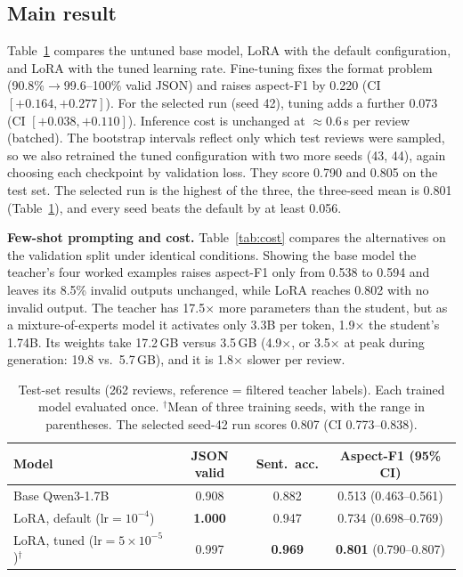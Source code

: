 \documentclass[journal]{IEEEtran}
\begin{document}
\subsection{Main result}
Table~\ref{tab:main} compares the untuned base model, LoRA with the default configuration, and LoRA with the tuned
learning rate. Fine-tuning fixes the format problem (90.8\%$\rightarrow$99.6--100\% valid JSON) and raises
aspect-F1 by 0.220 (CI $[+0.164, +0.277]$). For the selected run (seed 42), tuning adds a further 0.073
(CI $[+0.038, +0.110]$). Inference cost is unchanged at $\approx$0.6\,s per review (batched). The bootstrap intervals
reflect only which test reviews were sampled, so we also retrained the tuned configuration with two more seeds (43, 44),
again choosing each checkpoint by validation loss. They score 0.790 and 0.805 on the test set. The selected run is the
highest of the three, the three-seed mean is 0.801 (Table~\ref{tab:main}), and every seed beats the default by at least
0.056.

\textbf{Few-shot prompting and cost.} Table~\ref{tab:cost} compares the alternatives on the validation split under
identical conditions. Showing the base model the teacher's four worked examples raises aspect-F1 only from 0.538 to 0.594
and leaves its 8.5\% invalid outputs unchanged, while LoRA reaches 0.802 with no invalid output. The teacher has
17.5$\times$ more parameters than the student, but as a mixture-of-experts model it activates only 3.3B per token,
1.9$\times$ the student's 1.74B. Its weights take 17.2\,GB versus 3.5\,GB (4.9$\times$, or 3.5$\times$ at peak during
generation: 19.8 vs.\ 5.7\,GB), and it is 1.8$\times$ slower per review.

\begin{table}[t]
\centering
\caption{Test-set results (262 reviews, reference = filtered teacher labels). Each trained model evaluated once.
$^\dagger$Mean of three training seeds, with the range in parentheses. The selected seed-42 run scores 0.807
(CI 0.773--0.838).}
\label{tab:main}
\setlength{\tabcolsep}{1.8pt}
\begin{tabular}{lccc}
\toprule
Model & JSON valid & Sent.\ acc. & Aspect-F1 (95\% CI) \\
\midrule
Base Qwen3-1.7B & 0.908 & 0.882 & 0.513 (0.463--0.561) \\
LoRA, default ($\text{lr}=10^{-4}$) & \textbf{1.000} & 0.947 & 0.734 (0.698--0.769) \\
LoRA, tuned ($\text{lr}=5{\times}10^{-5}$)$^\dagger$ & 0.997 & \textbf{0.969} & \textbf{0.801} (0.790--0.807) \\
\bottomrule
\end{tabular}
\end{table}
\end{document}
